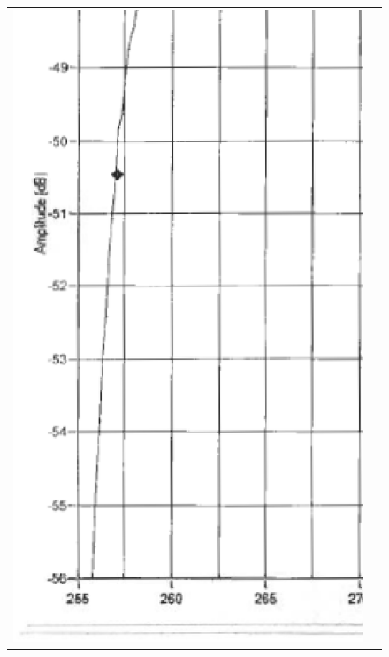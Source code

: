 \begin{figure}[H]
\begin{tabular}{c c}
    \includegraphics[bb=249 194 1431 1035,scale=0.2]{graphics/log_book/ch12_lowf.eps} & 

\end{tabular}
\end{figure}
